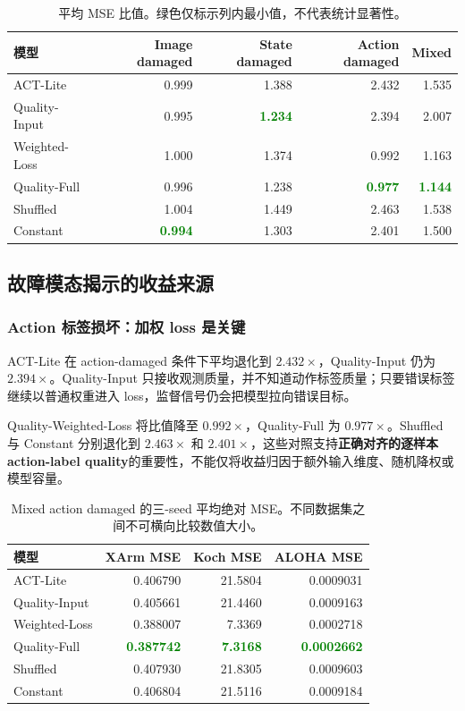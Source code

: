 \documentclass[11pt,a4paper,fontset=fandol]{ctexart}
\newcommand{\good}[1]{\textcolor{green}{\bfseries #1}}
\begin{document}
\begin{table}[H]
\centering
\small
\begin{tabular}{lrrrr}
\toprule
模型 & Image damaged & State damaged & Action damaged & Mixed\\
\midrule
ACT-Lite & 0.999 & 1.388 & 2.432 & 1.535\\
Quality-Input & 0.995 & \good{1.234} & 2.394 & 2.007\\
Weighted-Loss & 1.000 & 1.374 & 0.992 & 1.163\\
Quality-Full & 0.996 & 1.238 & \good{0.977} & \good{1.144}\\
Shuffled & 1.004 & 1.449 & 2.463 & 1.538\\
Constant & \good{0.994} & 1.303 & 2.401 & 1.500\\
\bottomrule
\end{tabular}
\caption{平均 MSE 比值。绿色仅标示列内最小值，不代表统计显著性。}
\end{table}

\clearpage\subsection{故障模态揭示的收益来源}
\subsubsection{Action 标签损坏：加权 loss 是关键}

ACT-Lite 在 action-damaged 条件下平均退化到 $2.432\times$，Quality-Input 仍为 $2.394\times$。Quality-Input 只接收观测质量，并不知道动作标签质量；只要错误标签继续以普通权重进入 loss，监督信号仍会把模型拉向错误目标。

Quality-Weighted-Loss 将比值降至 $0.992\times$，Quality-Full 为 $0.977\times$。Shuffled 与 Constant 分别退化到 $2.463\times$ 和 $2.401\times$，这些对照支持\textbf{正确对齐的逐样本 action-label quality}的重要性，不能仅将收益归因于额外输入维度、随机降权或模型容量。

\begin{table}[htbp]
\centering
\small
\begin{tabularx}{\linewidth}{Y rrr}
\toprule
模型 & XArm MSE & Koch MSE & ALOHA MSE\\
\midrule
ACT-Lite & 0.406790 & 21.5804 & 0.0009031\\
Quality-Input & 0.405661 & 21.4460 & 0.0009163\\
Weighted-Loss & 0.388007 & 7.3369 & 0.0002718\\
Quality-Full & \good{0.387742} & \good{7.3168} & \good{0.0002662}\\
Shuffled & 0.407930 & 21.8305 & 0.0009603\\
Constant & 0.406804 & 21.5116 & 0.0009184\\
\bottomrule
\end{tabularx}
\caption{Mixed action damaged 的三-seed 平均绝对 MSE。不同数据集之间不可横向比较数值大小。}
\end{table}
\end{document}

